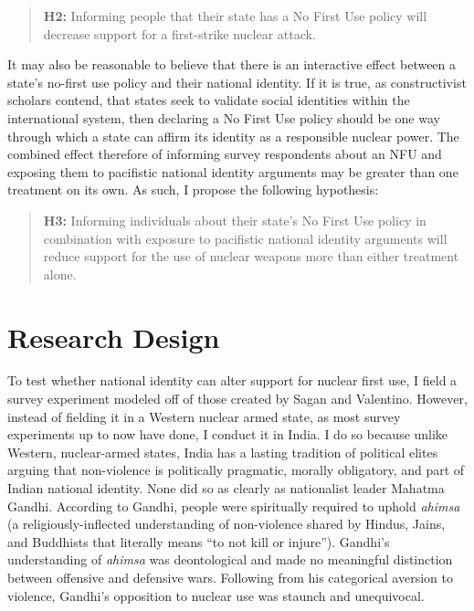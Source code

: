 \documentclass[12pt]{article}
\begin{document}
\begin{quote}
\textbf{H2:} Informing people that their state has a No First Use policy will decrease support for a first-strike nuclear attack.
\end{quote}

It may also be reasonable to believe that there is an interactive effect between a state's no-first use policy and their national identity. If it is true, as constructivist scholars contend, that states seek to validate social identities within the international system, then declaring a No First Use policy should be one way through which a state can affirm its identity as a responsible nuclear power. The combined effect therefore of informing survey respondents about an NFU and exposing them to pacifistic national identity arguments may be greater than one treatment on its own. As such, I propose the following hypothesis:

\begin{quote}
\textbf{H3:} Informing individuals about their state’s No First Use policy in combination with exposure to pacifistic national identity arguments will reduce support for the use of nuclear weapons more than either treatment alone.
\end{quote}

\section{Research Design}
To test whether national identity can alter support for nuclear first use, I field a survey experiment modeled off of those created by Sagan and Valentino. However, instead of fielding it in a Western nuclear armed state, as most survey experiments up to now have done, I conduct it in India. I do so because unlike Western, nuclear-armed states, India has a lasting tradition of political elites arguing that non-violence is politically pragmatic, morally obligatory, and part of Indian national identity. None did so as clearly as nationalist leader Mahatma Gandhi. According to Gandhi, people were spiritually required to uphold \textit{ahimsa} (a religiously-inflected understanding of non-violence shared by Hindus, Jains, and Buddhists that literally means “to not kill or injure”). Gandhi's understanding of \textit{ahimsa} was deontological and made no meaningful distinction between offensive and defensive wars. Following from his categorical aversion to violence, Gandhi's opposition to nuclear use was staunch and unequivocal.
\end{document}

